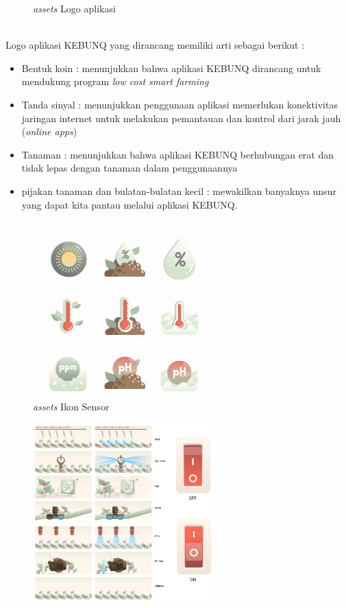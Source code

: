 \begin{flushleft}
\begin{justify}
\begin{enumerate}
\begin{figure}[ht]
                \caption{\textit{assets} Logo aplikasi}
            \end{figure}
            \noindent \\Logo aplikasi KEBUNQ yang dirancang memiliki arti sebagai berikut :
            \begin{itemize}
                \item Bentuk koin : menunjukkan bahwa aplikasi KEBUNQ dirancang untuk mendukung program \emph{low cost smart farming}
                \item Tanda sinyal : menunjukkan penggunaan aplikasi memerlukan konektivitas jaringan internet untuk melakukan pemantauan dan kontrol dari jarak jauh (\emph{online apps})
                \item Tanaman : menunjukkan bahwa aplikasi KEBUNQ berhubungan erat dan tidak lepas dengan tanaman dalam penggunaannya
                \item pijakan tanaman dan bulatan-bulatan kecil : mewakilkan banyaknya unsur yang dapat kita pantau melalui aplikasi KEBUNQ.\\\\
            \end{itemize}
            \begin{figure}[ht]
                \centering
                \includegraphics[width=7cm]{images/UI/ikon.png}
                \caption{\textit{assets} Ikon Sensor}
            \end{figure}
            \begin{figure}[ht]
                \centering
                \includegraphics[width=7cm]{images/UI/Frame 1.png}

\end{figure}
\end{enumerate}
\end{justify}
\end{flushleft}
